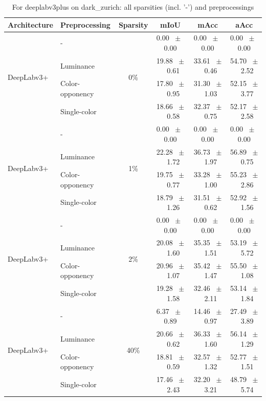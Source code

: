 \begin{table}[h]
  \centering
  \caption{For deeplabv3plus on dark_zurich: all sparsities (incl. '-') and preprocessings}
  \begin{tabular}{@{}l l c c c c@{}}
    \toprule
    Architecture & Preprocessing & Sparsity & mIoU & mAcc & aAcc \\
    \midrule
    \multirow{4}{*}{DeepLabv3+} & - & \multirow{4}{*}{0\%} & 0.00 ~$\pm$~ 0.00 & 0.00 ~$\pm$~ 0.00 & 0.00 ~$\pm$~ 0.00 \\
    & Luminance &  & 19.88 ~$\pm$~ 0.61 & 33.61 ~$\pm$~ 0.46 & 54.70 ~$\pm$~ 2.52 \\
    & Color-opponency &  & 17.80 ~$\pm$~ 0.95 & 31.30 ~$\pm$~ 1.03 & 52.15 ~$\pm$~ 3.77 \\
    & Single-color &  & 18.66 ~$\pm$~ 0.58 & 32.37 ~$\pm$~ 0.75 & 52.17 ~$\pm$~ 2.58 \\
    \midrule
    \multirow{4}{*}{DeepLabv3+} & - & \multirow{4}{*}{1\%} & 0.00 ~$\pm$~ 0.00 & 0.00 ~$\pm$~ 0.00 & 0.00 ~$\pm$~ 0.00 \\
    & Luminance &  & 22.28 ~$\pm$~ 1.72 & 36.73 ~$\pm$~ 1.97 & 56.89 ~$\pm$~ 0.75 \\
    & Color-opponency &  & 19.75 ~$\pm$~ 0.77 & 33.28 ~$\pm$~ 1.00 & 55.23 ~$\pm$~ 2.86 \\
    & Single-color &  & 18.79 ~$\pm$~ 1.26 & 31.51 ~$\pm$~ 0.62 & 52.92 ~$\pm$~ 1.56 \\
    \midrule
    \multirow{4}{*}{DeepLabv3+} & - & \multirow{4}{*}{2\%} & 0.00 ~$\pm$~ 0.00 & 0.00 ~$\pm$~ 0.00 & 0.00 ~$\pm$~ 0.00 \\
    & Luminance &  & 20.08 ~$\pm$~ 1.60 & 35.35 ~$\pm$~ 1.51 & 53.19 ~$\pm$~ 5.72 \\
    & Color-opponency &  & 20.96 ~$\pm$~ 1.07 & 35.42 ~$\pm$~ 1.47 & 55.50 ~$\pm$~ 1.08 \\
    & Single-color &  & 19.28 ~$\pm$~ 1.58 & 32.46 ~$\pm$~ 2.11 & 53.14 ~$\pm$~ 1.84 \\
    \midrule
    \multirow{4}{*}{DeepLabv3+} & - & \multirow{4}{*}{40\%} & 6.37 ~$\pm$~ 0.89 & 14.46 ~$\pm$~ 0.97 & 27.49 ~$\pm$~ 3.89 \\
    & Luminance &  & 20.66 ~$\pm$~ 0.62 & 36.33 ~$\pm$~ 1.60 & 56.14 ~$\pm$~ 1.29 \\
    & Color-opponency &  & 18.81 ~$\pm$~ 0.59 & 32.57 ~$\pm$~ 1.32 & 52.77 ~$\pm$~ 1.51 \\
    & Single-color &  & 17.46 ~$\pm$~ 2.43 & 32.20 ~$\pm$~ 3.21 & 48.79 ~$\pm$~ 5.74 \\
    \midrule

\end{tabular}
\end{table}

